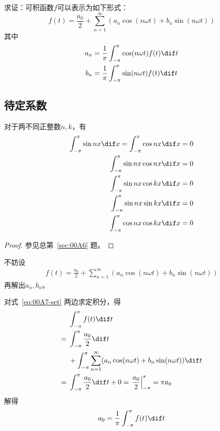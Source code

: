 

求证：可积函数$f$可以表示为如下形式：
\[ f(t) = \frac{a_0}2 + \sum_{n = 1}^\infty (a_n\cos(n\omega t) + b_n\sin(n\omega t)) \]
其中
\begin{align*}
  a_n &= \frac1\pi \int_{-\pi}^\pi \cos(n\omega t)f(t) \dif t \\
  b_n &= \frac1\pi \int_{-\pi}^\pi \sin(n\omega t)f(t) \dif t
\end{align*}

\subsection{待定系数}

\begin{lemma} \label{lemma:00A7-tri}
  对于两不同正整数$n, k$，有
  \begin{align*}
    \int_{-\pi}^\pi \sin nx \dif x = \int_{-\pi}^\pi \cos nx \dif x &= 0 \\
    \int_{-\pi}^\pi \sin nx \cos nx \dif x &= 0 \\
    \int_{-\pi}^\pi \sin nx \cos kx \dif x &= 0 \\
    \int_{-\pi}^\pi \sin nx \sin kx \dif x &= 0 \\
    \int_{-\pi}^\pi \cos nx \cos kx \dif x &= 0
  \end{align*}
\end{lemma}

\begin{proof}
  参见总第~\ref{sec:00A6} 题。
\end{proof}

不妨设
\begin{align}
  f(t) = \frac{a_0}2 + \sum_{n = 1}^\infty (a_n\cos(n\omega t) + b_n\sin(n\omega t)) \label{eq:00A7-set}
\end{align}
再解出$a_n, b_n$。

对式~\ref{eq:00A7-set} 两边求定积分，得
\begin{align*}
  & \int_{-\pi}^\pi f(t) \dif t \\
  ={}& \int_{-\pi}^\pi \frac{a_0}2 \dif t \\
  &+ \int_{-\pi}^\pi \sum_{n = 1}^\infty (a_n\cos(n\omega t) + b_n\sin(n\omega t)) \dif t \\
  ={}& \int_{-\pi}^\pi \frac{a_0}2 \dif t + 0 = \left.\frac{a_0}2\right|_{-\pi}^\pi = \pi a_0 \\
\end{align*}
解得
\[ a_0 = \frac1\pi\int_{-\pi}^\pi f(t) \dif t \]

